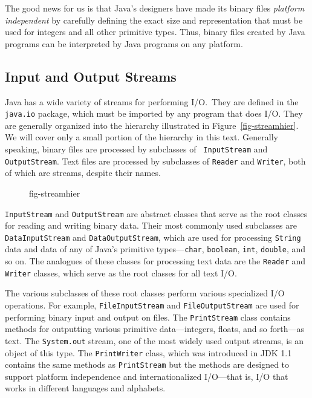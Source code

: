 The good news for us is that Java's designers have made its binary
files {\em platform independent} by carefully defining the exact size
and representation that must be used for integers and all other
primitive types.  Thus, binary files created by Java programs can be
interpreted by Java programs on any platform.


\subsection{Input and Output Streams}
\noindent Java has a wide variety of streams for performing I/O.~They
are defined in the {\tt java.io} package, which must be imported by
any program that does I/O.  They are generally organized into the
hierarchy illustrated in Figure~\ref{fig-streamhier}.  We will cover
only a small portion of the hierarchy in this text.  Generally
speaking, binary files are processed by subclasses of {\tt
InputStream} and {\tt OutputStream}.   Text
files are processed by subclasses of {\tt Reader} and {\tt Writer},
both of which are streams, despite their names.  

\begin{figure}[t!]
 {fig-streamhier}
\end{figure}

{\tt InputStream} and {\tt OutputStream} are abstract classes that
serve as the root classes for reading and writing binary data.  Their
most commonly used subclasses are {\tt DataInputStream} and
{\tt DataOutputStream}, which are used for processing {\tt String} data and
data of any of Java's primitive types---{\tt char},
{\tt boolean}, {\tt int}, {\tt double}, and so on.  The analogues of these
classes for processing text data are the {\tt Reader} and {\tt Writer}
classes, which serve as the root classes for all text I/O.


\noindent The various subclasses of these root classes perform various
specialized I/O operations.  For example, {\tt FileInputStream} and
{\tt File\-Output\-Stream} are used for performing binary input and
output on files.  The {\tt PrintStream} class contains methods for
outputting various primitive data---integers, floats, and so
forth---as text.  The {\tt System.out} stream, one of the most widely
used output streams, is an object of this type.  The {\tt PrintWriter}
class, which was introduced in JDK 1.1 contains the same methods as
{\tt PrintStream} but the methods are designed to support platform
independence and internationalized I/O---that is, I/O that works in
different languages and alphabets.

